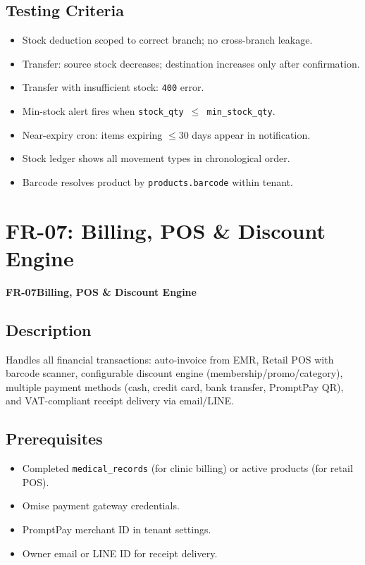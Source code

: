 \documentclass[12pt,a4paper]{report}
\newcommand{\testcheck}{\textcolor{successgreen}{\ding{51}}}
\newcommand{\moduleheader}[2]{%
  \par\vspace{6pt}%
  \noindent\colorbox{branddark}{\color{white}\textbf{\small #1}}\quad\textbf{\large #2}%
  \par\vspace{4pt}%
}
\begin{document}
\section{Testing Criteria}

\begin{itemize}
  \item[\testcheck] Stock deduction scoped to correct branch; no cross-branch leakage.
  \item[\testcheck] Transfer: source stock decreases; destination increases only after confirmation.
  \item[\testcheck] Transfer with insufficient stock: \texttt{400} error.
  \item[\testcheck] Min-stock alert fires when \texttt{stock\_qty $\leq$ min\_stock\_qty}.
  \item[\testcheck] Near-expiry cron: items expiring $\leq$30 days appear in notification.
  \item[\testcheck] Stock ledger shows all movement types in chronological order.
  \item[\testcheck] Barcode resolves product by \texttt{products.barcode} within tenant.
\end{itemize}

\chapter{FR-07: Billing, POS \& Discount Engine}

\moduleheader{FR-07}{Billing, POS \& Discount Engine}

\section{Description}

Handles all financial transactions: auto-invoice from EMR, Retail POS with barcode scanner, configurable discount engine (membership/promo/category), multiple payment methods (cash, credit card, bank transfer, PromptPay QR), and VAT-compliant receipt delivery via email/LINE.

\section{Prerequisites}

\begin{itemize}
  \item Completed \texttt{medical\_records} (for clinic billing) or active products (for retail POS).
  \item Omise payment gateway credentials.
  \item PromptPay merchant ID in tenant settings.
  \item Owner email or LINE ID for receipt delivery.
\end{itemize}
\end{document}
